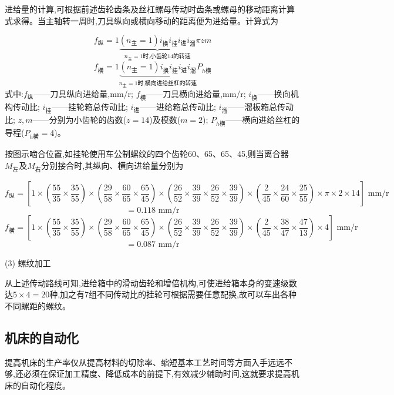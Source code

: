 \documentclass[UTF8]{ctexbook}
\newcommand{\◎}{\ensuremath{\bigcirc}}
\begin{document}
进给量的计算,可根据前述齿轮齿条及丝杠螺母传动时齿条或螺母的移动距离计算式求得。当主轴转一周时,刀具纵向或横向移动的距离便为进给量。计算式为

\[ f_{\text{纵}} = 1 \underbrace{(n_{\text{主}}=1) i_{\text{换}} i_{\text{挂}} i_{\text{进}} i_{\text{溜}}}_{n_{\text{主}}=1\text{时,小齿轮14的转速}} \pi z m \]
\[ f_{\text{横}} = 1 \underbrace{(n_{\text{主}}=1) i_{\text{换}} i_{\text{挂}} i_{\text{进}} i_{\text{溜}}}_{n_{\text{主}}=1\text{时,横向进给丝杠的转速}} P_{h\text{横}} \]
式中:$f_{\text{纵}}$——刀具纵向进给量,mm/r;
$f_{\text{横}}$——刀具横向进给量,mm/r;
$i_{\text{换}}$——换向机构传动比;
$i_{\text{挂}}$——挂轮箱总传动比;
$i_{\text{进}}$——进给箱总传动比;
$i_{\text{溜}}$——溜板箱总传动比;
$z, m$——分别为小齿轮的齿数($z=14$)及模数($m=2$);
$P_{h\text{横}}$——横向进给丝杠的导程($P_{h\text{横}}=4$)。

按图示啮合位置,如挂轮使用车公制螺纹的四个齿轮60、65、65、45,则当离合器$M_{\text{左}}$及$M_{\text{右}}$分别接合时,其纵向、横向进给量分别为

\[ f_{\text{纵}} = \left[ 1 \times \left( \frac{55}{35} \times \frac{35}{55} \right) \times \left( \frac{29}{58} \times \frac{60}{65} \times \frac{65}{45} \right) \times \left( \frac{26}{52} \times \frac{39}{39} \times \frac{26}{52} \times \frac{39}{39} \right) \times \left( \frac{2}{45} \times \frac{24}{60} \times \frac{25}{55} \right) \times \pi \times 2 \times 14 \right] \text{ mm/r} \]
\[ = 0.118 \text{ mm/r} \]
\[ f_{\text{横}} = \left[ 1 \times \left( \frac{55}{35} \times \frac{35}{55} \right) \times \left( \frac{29}{58} \times \frac{60}{65} \times \frac{65}{45} \right) \times \left( \frac{26}{52} \times \frac{39}{39} \times \frac{26}{52} \times \frac{39}{39} \right) \times \left( \frac{2}{45} \times \frac{38}{47} \times \frac{47}{13} \right) \times 4 \right] \text{ mm/r} \]
\[ = 0.087 \text{ mm/r} \]

(3) 螺纹加工

从上述传动路线可知,进给箱中的滑动齿轮和增倍机构,可使进给箱本身的变速级数达$5 \times 4 = 20$种,加之有7组不同传动比的挂轮可根据需要任意配换,故可以车出各种不同螺距的螺纹。

\subsection{机床的自动化}

提高机床的生产率仅从提高材料的切除率、缩短基本工艺时间等方面入手远远不够,还必须在保证加工精度、降低成本的前提下,有效减少辅助时间,这就要求提高机床的自动化程度。
\end{document}
